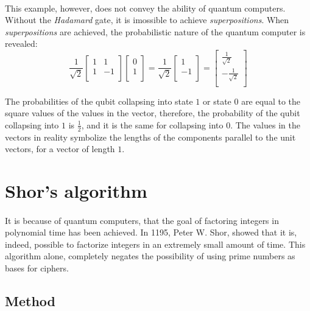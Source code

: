 \documentclass[a4paper, 10pt]{article}
\begin{document}
\paragraph*{}
This example, however, does not convey the ability of quantum computers. Without the \textit{Hadamard} gate, it is 
imossible to achieve \textit{superpositions}. When \textit{superpositions} are achieved, the probabilistic nature of 
the quantum computer is revealed:
$$
\frac{1}{\sqrt{2}}
\begin{bmatrix}
1 &  1 \\
1 & -1 \\
\end{bmatrix}
\begin{bmatrix}
0 \\
1 \\
\end{bmatrix}
=
\frac{1}{\sqrt{2}}
\begin{bmatrix}
 1 \\
-1 \\
\end{bmatrix}
=
\begin{bmatrix}
 \frac{1}{\sqrt{2}} \\
-\frac{1}{\sqrt{2}} \\
\end{bmatrix}
$$

The probabilities of the qubit collapsing into state $1$ or state $0$ are equal to the square values of the values in 
the vector, therefore, the probability of the qubit collapsing into $1$ is $\frac{1}{2}$, and it is the same for 
collapsing into $0$. The values in the vectors in reality symbolize the lengths of the components parallel to the 
unit vectors, for a vector of length $1$.

\section{Shor's algorithm}
\paragraph*{}
It is because of quantum computers, that the goal of factoring integers in polynomial time has been achieved. In 1195, 
Peter W. Shor, showed that it is, indeed, possible to factorize integers in an extremely small amount of time. This 
algorithm alone, completely negates the possibility of using prime numbers as bases for ciphers.

\subsection{Method}
\end{document}
